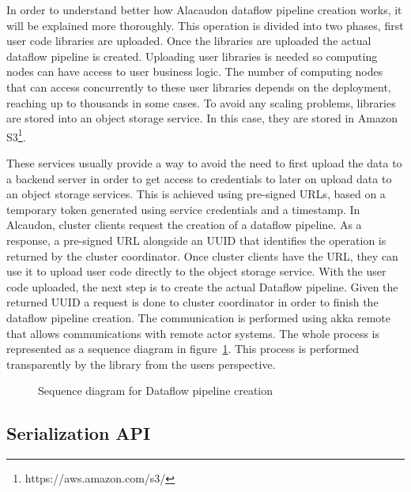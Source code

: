 In order to understand better how Alacaudon dataflow pipeline creation works, it
will be explained more thoroughly. This operation is divided into two phases,
first user code libraries are uploaded. Once the libraries are uploaded the
actual dataflow pipeline is created. Uploading user libraries is needed so
computing nodes can have access to user business logic. The number of computing nodes that
can access concurrently to these user libraries depends on the deployment,
reaching up to thousands in some cases. To avoid any scaling problems, libraries
are stored into an object storage service. In this case, they are stored in
Amazon S3\footnote{https://aws.amazon.com/s3/}.

These services usually provide a
way to avoid the need to first upload the data to a backend server in order to
get access to credentials to later on upload data to an object storage services.
This is achieved using pre-signed URLs, based on a temporary token generated
using service credentials and a timestamp. In Alcaudon, cluster clients
request the creation of a dataflow pipeline. As a response, a pre-signed URL
alongside an UUID that identifies the operation is returned by the cluster
coordinator. Once cluster clients have the URL, they can use it to upload user
code directly to the object storage service. With the user code uploaded, the
next step is to create the actual Dataflow pipeline. Given the returned UUID a
request is done to cluster coordinator in order to finish the dataflow pipeline
creation. The communication is performed using akka remote that allows
communications with remote actor systems. The whole process is represented as a
sequence diagram in figure~\ref{fig:pipelinecreation}. This process is performed
transparently by the library from the users perspective.

\begin{figure}[!h]
  \centering
  \scalebox{0.6}{
    
  }
\caption{Sequence diagram for Dataflow pipeline creation}
\label{fig:pipelinecreation}
\end{figure}

\subsection{Serialization API}


